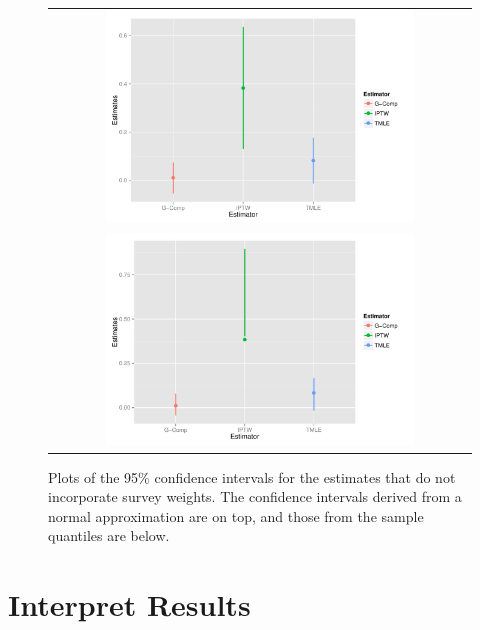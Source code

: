 \documentclass{article}
\begin{document}
\begin{figure}
\centering
\begin{tabular}{c}
\includegraphics[width=0.75\textwidth]{figures/naiveBootstrapNormalCI.pdf} \\
\includegraphics[width=0.75\textwidth]{figures/naiveBootstrapQuantileCI.pdf}
\end{tabular}
\caption{Plots of the 95\% 	confidence intervals for the estimates that do not incorporate survey weights. The confidence intervals derived from a normal approximation are on top, and those from the sample quantiles are below.}
\label{fig:boot.distr}
\end{figure}

\section{Interpret Results}



{}

\end{document}
